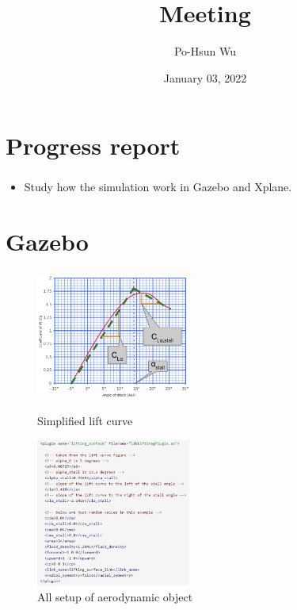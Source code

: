 \documentclass{beamer}
\date{January 03, 2022}
\title{Meeting}
\author{Po-Hsun Wu}
\begin{document}
    \frame{\titlepage}

    \section{Progress report}

    \begin{frame}
        \frametitle{\secname}
        \begin{itemize}
            \item Study how the simulation work in Gazebo and Xplane.
        \end{itemize}
    \end{frame}

    \section{Gazebo}

    \begin{frame}
        \frametitle{\secname}
        \centering
        \begin{figure}[h!]
            \begin{multicols}{2}
                \includegraphics[width=2in]{Figs/lift_curve_simplified.png}
                \caption{Simplified lift curve}
                \columnbreak

                \includegraphics[width=2in]{Figs/Lift_curve_setup.JPG}
                \caption{All setup of aerodynamic object}
            \end{multicols}
        \end{figure}
    \end{frame}
\end{document}
